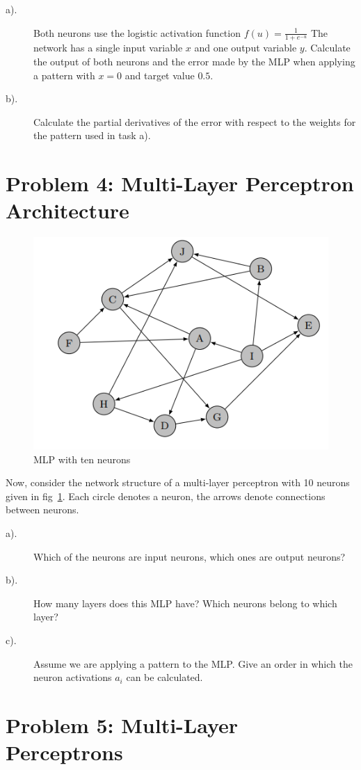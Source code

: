 \documentclass[12pt]{article}
\begin{document}
\begin{description}
	\item[a).]	Both neurons use the logistic activation function
	      $f(u)=\frac{1}{1+e^{-u}}$
	      The network has
	      a single input variable $x$ and one output variable $y$. Calculate the output of both
	      neurons and the error made by the MLP when applying a pattern with $x = 0$ and
	      target value $0.5$.
	\item[b).] Calculate the partial derivatives of the error with respect to the weights for the
	      pattern used in task a).
\end{description}

\section{Problem 4: Multi-Layer Perceptron Architecture}

\begin{figure}[!htbp]
	\centering
	\includegraphics[width=.55\textwidth]{fig/2018-03-19-13-54-31.png}
	\caption{MLP with ten neurons} \label{fig:mlp2}
\end{figure}

Now, consider the network structure of a multi-layer perceptron with 10 neurons given in
fig~\ref{fig:mlp2}. Each circle denotes a neuron, the arrows denote connections between neurons.
\begin{description}
	\item[a).]  Which of the neurons are input neurons, which ones are output neurons?
	\item[b).] How many layers does this MLP have? Which neurons belong to which layer?
	\item[c).] Assume we are applying a pattern to the MLP. Give an order in which the neuron
	      activations $a_i$ can be calculated.
\end{description}

\section{Problem 5: Multi-Layer Perceptrons}
\end{document}
